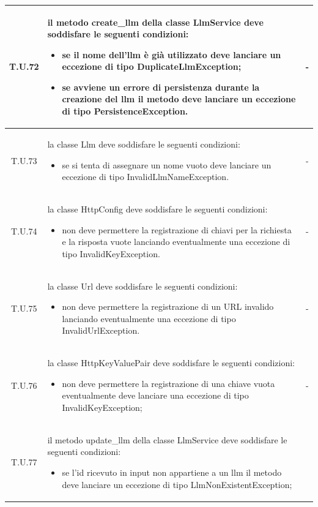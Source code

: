 \begin{tabularx}{\textwidth}{|c|X|c|}
    \hline 
    \label{tu:tu72} T.U.72 & il metodo create\_llm della classe LlmService deve soddisfare le seguenti condizioni:
    \begin{itemize}
        \item se il nome dell'llm è già utilizzato deve lanciare un eccezione di tipo DuplicateLlmException;
        \item se avviene un errore di persistenza durante la creazione del llm il metodo deve lanciare un eccezione di tipo PersistenceException.
    \end{itemize} & - \\
    \hline 
    \label{tu:tu73} T.U.73 & la classe Llm deve soddisfare le seguenti condizioni:
    \begin{itemize}
        \item se si tenta di assegnare un nome vuoto deve lanciare un eccezione di tipo InvalidLlmNameException.
    \end{itemize} & - \\
    \hline 
    \label{tu:tu74} T.U.74 & la classe HttpConfig deve soddisfare le seguenti condizioni:
    \begin{itemize}
        \item non deve permettere la registrazione di chiavi per la richiesta e la risposta vuote lanciando eventualmente una eccezione di tipo InvalidKeyException. 
    \end{itemize} & - \\
    \hline
    \label{tu:tu75} T.U.75 & la classe Url deve soddisfare le seguenti condizioni:
    \begin{itemize}
        \item non deve permettere la registrazione di un URL invalido lanciando eventualmente una eccezione di tipo InvalidUrlException. 
    \end{itemize} & - \\
    \hline 
    \label{tu:tu76} T.U.76 & la classe HttpKeyValuePair deve soddisfare le seguenti condizioni:
    \begin{itemize}
        \item non deve permettere la registrazione di una chiave vuota eventualmente deve lanciare una eccezione di tipo InvalidKeyException; 
    \end{itemize} & - \\
    \hline
    \label{tu:tu77} T.U.77 & il metodo update\_llm della classe LlmService deve soddisfare le seguenti condizioni:
    \begin{itemize}
        \item se l'id ricevuto in input non appartiene a un llm il metodo deve lanciare un eccezione di tipo LlmNonExistentException;

\end{itemize}
\end{tabularx}

